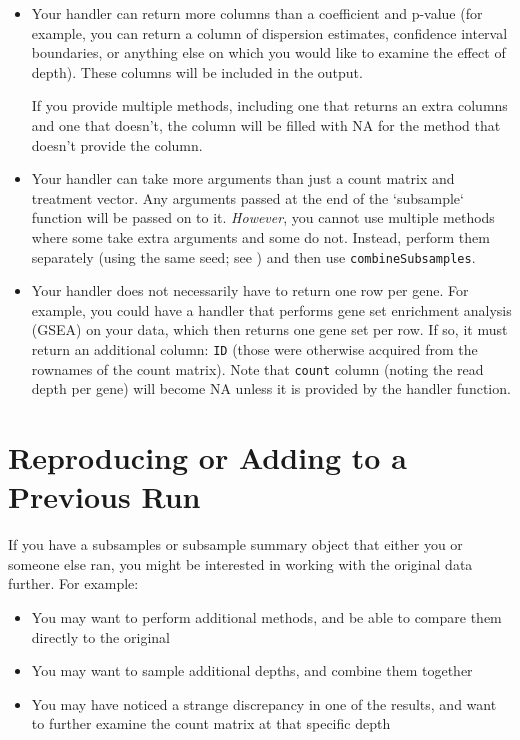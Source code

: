 \documentclass{article}\usepackage[]{graphicx}\usepackage[]{color}
\begin{document}
\begin{itemize}
\item Your handler can return more columns than a coefficient and p-value (for example, you can return a column of dispersion estimates, confidence interval boundaries, or anything else on which you would like to examine the effect of depth). These columns will be included in the output.

If you provide multiple methods, including one that returns an extra columns and one that doesn't, the column will be filled with NA for the method that doesn't provide the column.

\item Your handler can take more arguments than just a count matrix and treatment vector. Any arguments passed at the end of the `subsample` function will be passed on to it. \emph{However}, you cannot use multiple methods where some take extra arguments and some do not. Instead, perform them separately (using the same seed; see ) and then use \texttt{combineSubsamples}.

\item Your handler does not necessarily have to return one row per gene. For example, you could have a handler that performs gene set enrichment analysis (GSEA) on your data, which then returns one gene set per row. If so, it must return an additional column: \texttt{ID} (those were otherwise acquired from the rownames of the count matrix). Note that \texttt{count} column (noting the read depth per gene) will become NA unless it is provided by the handler function.

\end{itemize}

\section{Reproducing or Adding to a Previous Run}

\label{sec:seed}

If you have a subsamples or subsample summary object that either you or someone else ran, you might be interested in working with the original data further. For example:

\begin{itemize}
\item You may want to perform additional methods, and be able to compare them directly to the original
\item You may want to sample additional depths, and combine them together 
\item You may have noticed a strange discrepancy in one of the results, and want to further examine the count matrix at that specific depth
\end{itemize}
\end{document}
